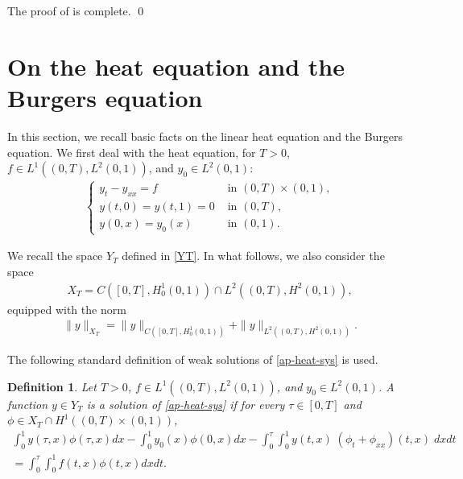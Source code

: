 \documentclass[11pt, reqno]{amsart}
\theoremstyle{plain}
\newtheorem{definition}{Definition}[section]
\numberwithin{equation}{section}
\begin{document}
\medskip
The proof of   is complete. \qed


\appendix

\section{On the heat equation and the Burgers equation}
 \label{wp-bg} 
 \label{controlheatu(t)}
 
 
In this section, we recall basic facts on the linear heat equation and the Burgers equation. We first deal with the heat equation, for $T>0$, $f \in L^1((0, T), L^2(0, 1))$, and $y_0 \in L^2(0, 1)$: 
\begin{align}	
	\begin{cases}	\label{ap-heat-sys}
		y_t - y_{xx} = f \quad &\text{ in } (0, T) \times (0, 1), \\[6pt]
		y(t, 0) = y(t, 1) = 0 &\text{ in } (0, T), \\[6pt]
		y(0, x) = y_0(x) &\text{ in } (0, 1).
	\end{cases}
\end{align}

We recall the space $Y_T$ defined in \eqref{YT}. In what follows, we also consider the space
\begin{align*}
	X_T = C([0, T], H^1_0(0, 1)) \cap L^2((0, T), H^2(0, 1)),
\end{align*}
equipped with the norm
\begin{align*}
	 \|y\|_{X_T} = \|y\|_{ C([0, T], H^1_0(0, 1))} + \|y\|_{ L^2((0, T), H^2(0, 1))}.
\end{align*}

The following standard definition of weak solutions of \eqref{ap-heat-sys} is used. 

\begin{definition}	\label{def-heat-weaksolution}	Let $T > 0$, $f \in L^1((0, T), L^2(0, 1))$, and $y_0 \in L^2(0, 1)$. A function $y \in Y_T$ is a solution of \eqref{ap-heat-sys} if for every $\tau \in [0, T]$ and $\phi \in X_T \cap H^1((0, T) \times (0, 1))$,
\begin{multline} 	\label{heat-weaksolution}
	\int_0^1 y(\tau, x) \phi(\tau, x) dx - \int_0^1 y_0(x) \phi(0, x) dx - \int_0^{\tau} \int_0^1 y(t, x) \; (\phi_t + \phi_{xx} )(t, x) \; dx dt \\
	 = \int_0^{\tau} \int_0^1 f(t, x) \phi(t, x) dx dt.
\end{multline}
\end{definition}
\end{document}
